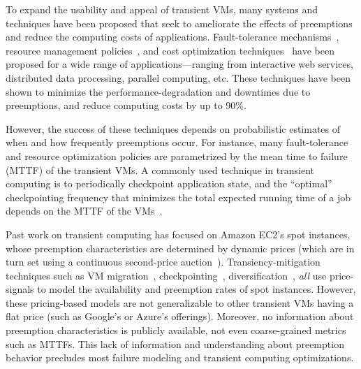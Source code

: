 To expand the usability and appeal of transient VMs, many systems and techniques have been proposed that seek to ameliorate the effects of preemptions and reduce the computing costs of applications. 
%
Fault-tolerance mechanisms~\cite{spotcheck, marathe2014exploiting}, resource management policies~\cite{exosphere, conductor}, and cost optimization techniques~\cite{dubois2016optispot, shastri2017hotspot} have been proposed for a wide range of applications---ranging from interactive web services, distributed data processing, parallel computing, etc.
%
These techniques have been shown to minimize the performance-degradation and downtimes due to preemptions, and reduce computing costs by up to 90\%. 


However, the success of these techniques depends on probabilistic estimates of when and how frequently preemptions occur. 
For instance, many fault-tolerance and resource optimization policies are parametrized by the mean time to failure (MTTF) of the transient VMs. 
A commonly used technique in transient computing is 
to periodically checkpoint application state, and the ``optimal'' checkpointing frequency that minimizes the total expected running time of a job depends on the MTTF of the VMs~\cite{daly2006higher}. 





Past work on transient computing has focused on Amazon EC2's spot instances, whose preemption characteristics are determined by dynamic prices (which are in turn set using a continuous second-price auction~\cite{spot-pricing2}). 
Transiency-mitigation techniques such as VM migration~\cite{spotcheck}, checkpointing~\cite{flint, marathe2014exploiting}, diversification~\cite{exosphere}, \emph{all} use price-signals to model the availability and preemption rates of spot instances. 
However, these pricing-based models are not generalizable to other transient VMs having a flat price (such as Google's or Azure's offerings).
%
%
Moreover, no information about preemption characteristics is publicly available, not even coarse-grained metrics such as MTTFs. 
%
This lack of information and understanding about preemption behavior precludes most failure modeling and transient computing optimizations. 
%


